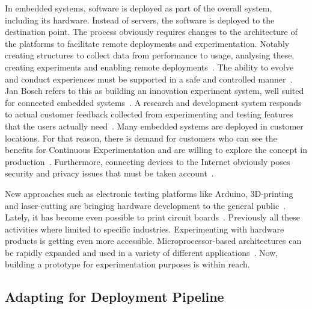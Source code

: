 \documentclass[english]{tktltiki2}
\begin{document}
In embedded systems, software is deployed as part of the overall system, including its hardware. Instead of servers, the software is deployed to the destination point. The process obviously requires changes to the architecture of the platforms to facilitate remote deployments and experimentation. Notably creating structures to collect data from performance to usage, analysing these, creating experiments and enabling remote deployments~\cite{BE12}. The ability to evolve and conduct experiences must be supported in a safe and controlled manner~\cite{BE12}. Jan Bosch refers to this as building an innovation experiment system, well suited for connected embedded systems~\cite{BE12, Bos12}. A research and development system responds to actual customer feedback collected from experimenting and testing features that the users actually need~\cite{HAB12}. Many embedded systems are deployed in customer locations. For that reason, there is demand for customers who can see the benefits for Continuous Experimentation and are willing to explore the concept in production~\cite{HAB12}. Furthermore, connecting devices to the Internet obviously poses security and privacy issues that must be taken account~\cite{BE12}.

New approaches such as electronic testing platforms like Arduino, 3D-printing and laser-cutting are bringing hardware development to the general public~\cite{Arduino}. Lately, it has become even possible to print circuit boards~\cite{Vol15}. Previously all these activities where limited to specific industries. Experimenting with hardware products is getting even more accessible. Microprocessor-based architectures can be rapidly expanded and used in a variety of different applications~\cite{KRM13}. Now, building a prototype for experimentation purposes is within reach.

\subsection{Adapting for Deployment Pipeline}
\end{document}
